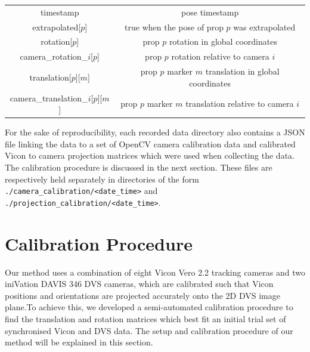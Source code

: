 \documentclass{article}
\begin{document}
\begin{center}
	\begin{tabular}{|c|c|}
		timestamp                           & pose timestamp \\
		extrapolated[$p$]                   & true when the pose of prop $p$ was extrapolated \\
		rotation[$p$]                       & prop $p$ rotation in global coordinates \\
		camera\_rotation\_$i$[$p$]          & prop $p$ rotation relative to camera $i$ \\
		translation[$p$][$m$]               & prop $p$ marker $m$ translation in global coordinates \\
		camera\_translation\_$i$[$p$][$m$]  & prop $p$ marker $m$ translation relative to camera $i$ \\
	\end{tabular}
\end{center}

For the sake of reproducibility, each recorded data directory also contains a JSON file linking the data to a set of OpenCV camera calibration data and calibrated Vicon to camera projection matrices which were used when collecting the data. The calibration procedure is discussed in the next section. These files are respectively held separately in directories of the form \lstinline|./camera_calibration/<date_time>| and \lstinline|./projection_calibration/<date_time>|.


\section{Calibration Procedure}
Our method uses a combination of eight Vicon Vero 2.2 tracking cameras and two iniVation DAVIS 346 DVS cameras, which are calibrated such that Vicon positions and orientations are projected accurately onto the 2D DVS image plane.To achieve this, we developed a semi-automated calibration procedure to find the translation and rotation matrices which best fit an initial trial set of synchronised Vicon and DVS data. The setup and calibration procedure of our method will be explained in this section.
\end{document}
